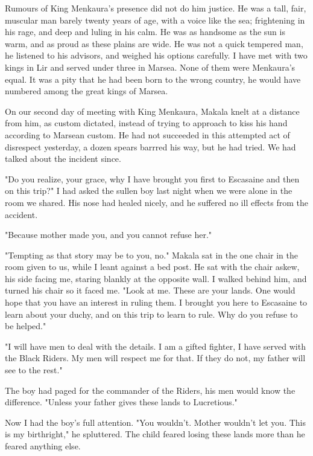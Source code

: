 \documentclass{article}
\begin{document}
\vspace{.5cm}

Rumours of King Menkaura's presence did not do him justice. He was a tall, fair, muscular man barely twenty years of age, with a voice like the sea; frightening in his rage, and deep and luling in his calm. He was as handsome as the sun is warm, and as proud as these plains are wide. He was not a quick tempered man, he listened to his advisors, and weighed his options carefully. I have met with two kings in Lir and served under three in Marsea. None of them were Menkaura's equal. It was a pity that he had been born to the wrong country, he would have numbered among the great kings of Marsea.

On our second day of meeting with King Menkaura, Makala knelt at a distance from him, as custom dictated, instead of trying to approach to kiss his hand according to Marsean custom. He had not succeeded in this attempted act of disrespect yesterday, a dozen spears barrred his way, but he had tried. We had talked about the incident since. 

"Do you realize, your grace, why I have brought you first to Escasaine and then on this trip?" I had asked the sullen boy last night when we were alone in the room we shared. His nose had healed nicely, and he suffered no ill effects from the accident.

"Because mother made you, and you cannot refuse her."

"Tempting as that story may be to you, no." Makala sat in the one chair in the room given to us, while I leant against a bed post. He sat with the chair askew, his side facing me, staring blankly at the opposite wall. I walked behind him, and turned his chair so it faced me. "Look at me. These are your lands. One would hope that you have an interest in ruling them. I brought you here to Escasaine to learn about your duchy, and on this trip to learn to rule. Why do you refuse to be helped."

"I will have men to deal with the details. I am a gifted fighter, I have served with the Black Riders. My men will respect me for that. If they do not, my father will see to the rest."

The boy had paged for the commander of the Riders, his men would know the difference. "Unless your father gives these lands to Lucretious."

Now I had the boy's full attention. "You wouldn't. Mother wouldn't let you. This is my birthright," he spluttered. The child feared losing these lands more than he feared anything else.
\end{document}
